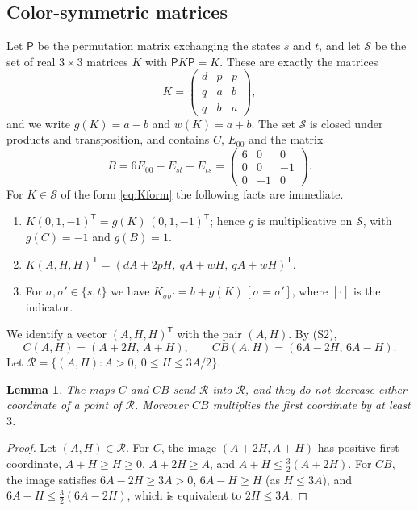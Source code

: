 \documentclass{amsart}
\newtheorem{lemma}[theorem]{Lemma}
\theoremstyle{definition}
\theoremstyle{remark}
\numberwithin{equation}{section}
\newcommand{\cS}{\mathcal{S}}
\newcommand{\cC}{\mathcal{R}}
\begin{document}
\subsection{Color-symmetric matrices}
Let $\mathsf P$ be the permutation matrix exchanging the states $s$ and $t$, and let $\cS$ be the set of real $3\times3$ matrices $K$ with $\mathsf PK\mathsf P=K$. These are exactly the matrices
\begin{equation}\label{eq:Kform}
K=\begin{pmatrix}d&p&p\\q&a&b\\q&b&a\end{pmatrix},
\end{equation}
and we write $g(K)=a-b$ and $w(K)=a+b$. The set $\cS$ is closed under products and transposition, and contains $C$, $E_{00}$ and the matrix
\[
B=6E_{00}-E_{st}-E_{ts}=\begin{pmatrix}6&0&0\\0&0&-1\\0&-1&0\end{pmatrix}.
\]
For $K\in\cS$ of the form \eqref{eq:Kform} the following facts are immediate.
\begin{enumerate}
\item[(S1)] $K(0,1,-1)^{\mathsf T}=g(K)\,(0,1,-1)^{\mathsf T}$; hence $g$ is multiplicative on $\cS$, with $g(C)=-1$ and $g(B)=1$.
\item[(S2)] $K(A,H,H)^{\mathsf T}=(dA+2pH,\ qA+wH,\ qA+wH)^{\mathsf T}$.
\item[(S3)] For $\sigma,\sigma'\in\{s,t\}$ we have $K_{\sigma\sigma'}=b+g(K)\,[\sigma=\sigma']$, where $[\cdot]$ is the indicator.
\end{enumerate}
We identify a vector $(A,H,H)^{\mathsf T}$ with the pair $(A,H)$. By (S2),
\[
C(A,H)=(A+2H,\,A+H),\qquad CB(A,H)=(6A-2H,\,6A-H).
\]
Let $\cC=\{(A,H):A>0,\ 0\le H\le 3A/2\}$.

\begin{lemma}\label{lem:cone}
The maps $C$ and $CB$ send $\cC$ into $\cC$, and they do not decrease either coordinate of a point of $\cC$. Moreover $CB$ multiplies the first coordinate by at least $3$.
\end{lemma}

\begin{proof}
Let $(A,H)\in\cC$. For $C$, the image $(A+2H,A+H)$ has positive first coordinate, $A+H\ge H\ge0$, $A+2H\ge A$, and $A+H\le\tfrac32(A+2H)$. For $CB$, the image satisfies $6A-2H\ge3A>0$, $6A-H\ge H$ (as $H\le3A$), and $6A-H\le\tfrac32(6A-2H)$, which is equivalent to $2H\le3A$.
\end{proof}
\end{document}

